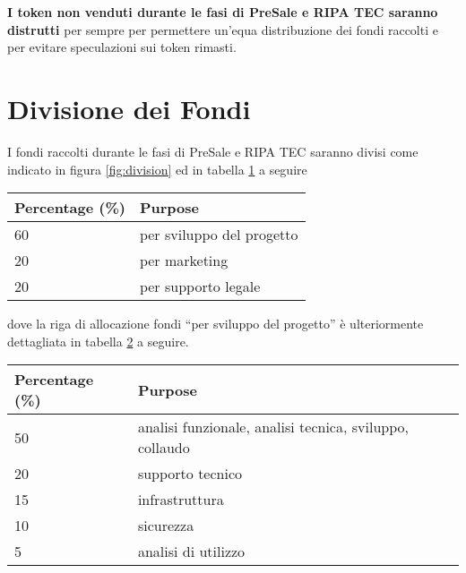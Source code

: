 \documentclass[11pt,fleqn]{book} %
\begin{document}
\vspace{5mm}
\textbf{I token non venduti durante le fasi di PreSale e RIPA TEC saranno distrutti} per sempre per permettere
un'equa distribuzione dei fondi raccolti e per evitare speculazioni sui token rimasti.

\section{Divisione dei Fondi}
I fondi raccolti durante le fasi di PreSale e RIPA TEC saranno divisi come indicato in figura \ref{fig:division} 
ed in tabella \ref{tab:division} a seguire

\vspace{5mm}
\label{fig:division}

\vspace{5mm}
\begin{table}[H]
	\centering
	\begin{tabular}{l l}
		\toprule
		\textbf{Percentage (\%)} & \textbf{Purpose} \\
		\midrule
		60		& per sviluppo del progetto	\\
		20		& per marketing	\\
		20		& per supporto legale	\\
		\bottomrule
	\end{tabular}
	\label{tab:division}
\end{table}

\vspace{5mm}
dove la riga di allocazione fondi ``per sviluppo del progetto'' è ulteriormente dettagliata in 
tabella \ref{tab:focus} a seguire.

\vspace{5mm}
\begin{table}[H]
	\centering
	\begin{tabular}{l l}
		\toprule
		\textbf{Percentage (\%)} & \textbf{Purpose} \\
		\midrule
		50		& analisi funzionale, analisi tecnica, sviluppo, collaudo	\\
		20		& supporto tecnico	\\
		15		& infrastruttura	\\
		10		& sicurezza	\\
		5		& analisi di utilizzo	\\
		\bottomrule
	\end{tabular}
	\label{tab:focus}
\end{table}
\end{document}
